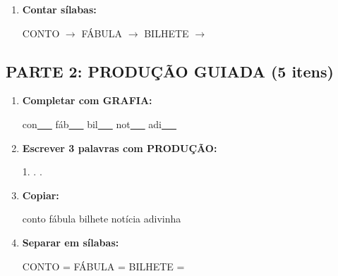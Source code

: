 \begin{exercicio}
\begin{enumerate}
  \item \textbf{Contar sílabas:}
  \begin{center}
  CONTO $\rightarrow$ \underline{\hspace{0.9cm}} \quad FÁBULA $\rightarrow$ \underline{\hspace{0.9cm}} \quad BILHETE $\rightarrow$ \underline{\hspace{0.9cm}}
  \end{center}

\end{enumerate}

\subsection*{PARTE 2: PRODUÇÃO GUIADA (5 itens)}

\begin{enumerate}[resume]

  \item \textbf{Completar com GRAFIA:}
  \begin{center}
  con\underline{~~~} \quad fáb\underline{~~~} \quad bil\underline{~~~} \quad not\underline{~~~} \quad adi\underline{~~~}
  \end{center}

  \item \textbf{Escrever 3 palavras com PRODUÇÃO:}
  \begin{center}
  1. \underline{\hspace{3cm}} . \underline{\hspace{3cm}} . \underline{\hspace{3cm}}
  \end{center}

  \item \textbf{Copiar:}
  \begin{center}
  conto \quad fábula \quad bilhete \quad notícia \quad adivinha
  \end{center}

  \item \textbf{Separar em sílabas:}
  \begin{center}
  CONTO = \underline{\hspace{1cm}} \underline{\hspace{1cm}} \quad FÁBULA = \underline{\hspace{1cm}} \underline{\hspace{1cm}} \quad BILHETE = \underline{\hspace{1cm}} \underline{\hspace{1cm}}
  \end{center}


\end{enumerate}
\end{exercicio}
